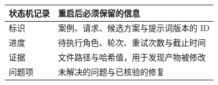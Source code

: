 \begin{tabular}{@{}P{3.0cm}P{9.5cm}@{}}
\toprule
\textbf{状态机记录} & \textbf{重启后必须保留的信息} \\
\midrule
标识 & 案例、请求、候选方案与提示词版本的 ID \\
进度 & 待执行角色、轮次、重试次数与截止时间 \\
证据 & 文件路径与哈希值，用于发现产物被修改 \\
问题项 & 未解决的问题与已核验的修复 \\
\bottomrule
\end{tabular}

